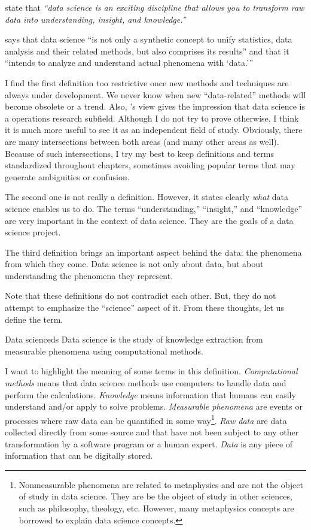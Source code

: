 \textcite{Wickham2023} state that \emph{``data science is an exciting discipline that
allows you to transform raw data into understanding, insight, and knowledge.''}

\textcite{Hayashi1998} says that data science ``is not only a
synthetic concept to unify statistics, data analysis and their related methods, but also
comprises its results'' and that it ``intends to analyze and understand actual phenomena
with `data.'{}''

I find the first definition too restrictive once new methods and techniques are always
under development.  We never know when new ``data-related'' methods will become obsolete
or a trend.  Also, \citeauthor{Zumel2019}'s view gives the impression that data science is a
operations research subfield.  Although I do not try to prove otherwise, I think it
is much more useful to see it as an independent field of study.  Obviously, there are
many intersections between both areas (and many other areas as well).  Because of such
intersections, I try my best to keep definitions and
terms standardized throughout chapters, sometimes avoiding popular terms that may generate
ambiguities or confusion.

The second one is not really a definition.  However, it states clearly \emph{what} data
science enables us to do.  The terms ``understanding,'' ``insight,'' and ``knowledge'' are
very important in the context of data science.  They are the goals of a data science
project.

The third definition brings an important aspect behind the data: the phenomena from which
they come.  Data science is not only about data, but about understanding the phenomena
they represent.

Note that these definitions do not contradict each other.  But, they do not attempt to
emphasize the ``science'' aspect of it.  From these thoughts, let us define the term.

\begin{defbox}{Data science}{ds}
  Data science is the study of knowledge extraction from
  measurable phenomena using computational methods.
\end{defbox}

I want to highlight the meaning of some terms in this definition.  \emph{Computational methods} means
that data science methods use computers to handle data and perform the calculations.
\emph{Knowledge} means information that humans can easily understand and/or apply to solve
problems.  \emph{Measurable phenomena} are events or processes where raw data can be
quantified in some way\footnote{%
  Nonmeasurable phenomena are related to metaphysics and are not the object of study in
  data science.  They are be the object of study in other sciences, such as
  philosophy, theology, etc.  However, many metaphysics concepts are borrowed to
  explain data science concepts.%
}.  \emph{Raw data} are data collected directly from some source and
that have not been subject to any other transformation by a software program or a human
expert.  \emph{Data} is any piece of information that can be digitally stored.


